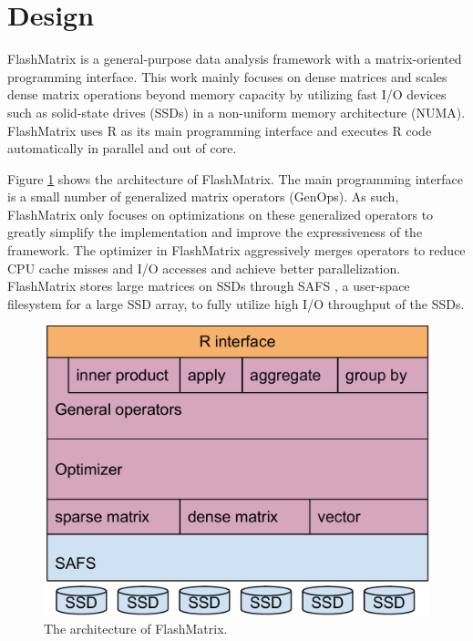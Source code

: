 \section{Design}

FlashMatrix is a general-purpose data analysis framework with a matrix-oriented
programming interface. This work mainly focuses on dense matrices and scales
dense matrix operations beyond memory capacity by utilizing fast I/O devices
such as solid-state drives (SSDs) in a non-uniform memory architecture (NUMA).
FlashMatrix uses R as its main programming interface and executes R code
automatically in parallel and out of core.

Figure \ref{fig:arch} shows the architecture of FlashMatrix. The main programming
interface is a small number of generalized matrix operators (GenOps). As such,
FlashMatrix only focuses on optimizations on these generalized operators
to greatly simplify the implementation and improve the expressiveness of
the framework. The optimizer in FlashMatrix aggressively merges operators to
reduce CPU cache misses and I/O accesses and achieve better parallelization.
FlashMatrix stores large matrices on SSDs through SAFS \cite{safs},
a user-space filesystem for a large SSD array, to fully utilize high I/O
throughput of the SSDs.

\begin{figure}
\centering
\includegraphics[scale=0.3]{./architecture.pdf}
\caption{The architecture of FlashMatrix.}
\label{fig:arch}
\end{figure}


